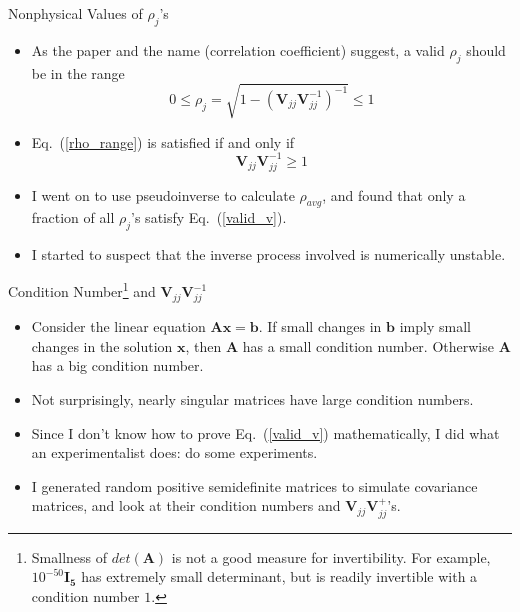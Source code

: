 \documentclass[aspectratio=169]{beamer}
\begin{document}
\begin{frame}{Nonphysical Values of $\rho_j$'s}
  \begin{itemize}
    \item As the paper and the name (correlation coefficient) suggest, a valid $\rho_j$ should be in the range
    \begin{equation}
      0\le \rho_j=\sqrt{1-\left(\mathbf{V}_{jj}\mathbf{V}^{-1}_{jj}\right)^{-1}} \le 1 \label{rho_range}
    \end{equation}
    \item Eq.~(\ref{rho_range}) is satisfied if and only if
    \begin{equation}
      \mathbf{V}_{jj}\mathbf{V}^{-1}_{jj} \ge 1 \label{valid_v}
    \end{equation}
    \item I went on to use pseudoinverse to calculate $\rho_{avg}$, and found that only a fraction of all $\rho_j$'s satisfy Eq.~(\ref{valid_v}).
    \item I started to suspect that the inverse process involved is numerically unstable.
  \end{itemize}
\end{frame}

\begin{frame}{Condition Number\footnote{\footnotesize Smallness of $det(\mathbf{A})$ is not a good measure for invertibility. For example, $10^{-50}\mathbf{I_5}$ has extremely small determinant, but is readily invertible with a condition number $1$.} and $\mathbf{V}_{jj}\mathbf{V}^{-1}_{jj}$}
  \begin{itemize}
    \item Consider the linear equation $\mathbf{A}\mathbf{x}=\mathbf{b}$. If small changes in $\mathbf{b}$ imply small changes in the solution $\mathbf{x}$, then $\mathbf{A}$ has a small condition number. Otherwise $\mathbf{A}$ has a big condition number.
    \item Not surprisingly, nearly singular matrices have large condition numbers.
    \item Since I don't know how to prove Eq.~(\ref{valid_v}) mathematically, I did what an experimentalist does: do some experiments.
    \item I generated random positive semidefinite matrices to simulate covariance matrices, and look at their condition numbers and $\mathbf{V}_{jj}\mathbf{V}^{+}_{jj}$'s.
  \end{itemize}
\end{frame}
\end{document}
